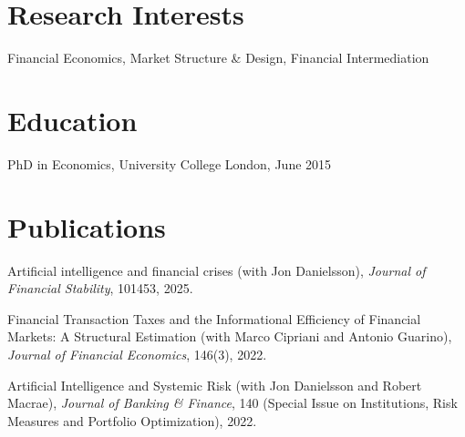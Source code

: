 \documentclass[margin,line, 11pt]{res}
\newenvironment{list1}{
  \begin{list}{\ding{113}}{%
      \setlength{\itemsep}{0in}
      \setlength{\parsep}{0in} \setlength{\parskip}{0in}
      \setlength{\topsep}{0in} \setlength{\partopsep}{0in} 
      \setlength{\leftmargin}{0.17in}}}{\end{list}}
\begin{document}
\begin{resume}
\section{\sc Research Interests}
\begin{list1}
\item[] Financial Economics, Market Structure \& Design, Financial Intermediation
\end{list1}

\section{\sc Education}

\begin{list1}
\item[] PhD in Economics, University College London, June 2015
\vspace*{0.2cm}

\end{list1}

\section{\sc Publications}
\begin{list1}
\item[] Artificial intelligence and financial crises (with Jon Danielsson), \textit{Journal of Financial Stability}, 101453, 2025.
\vspace*{0.2cm}
\item[] Financial Transaction Taxes and the Informational Efficiency of Financial Markets: A Structural Estimation (with Marco Cipriani and Antonio Guarino), \textit{Journal of Financial Economics}, 146(3), 2022.
\vspace*{0.2cm}
\item[] Artificial Intelligence and Systemic Risk (with Jon Danielsson and Robert Macrae), \textit{Journal of Banking \& Finance}, 140 (Special Issue on Institutions, Risk Measures and Portfolio Optimization), 2022.
\end{list1}


\end{resume}
\end{document}
